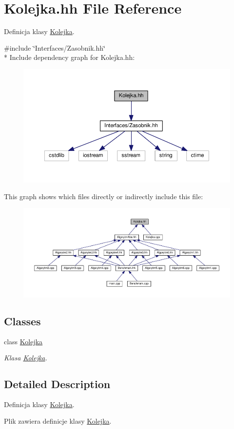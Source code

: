 \hypertarget{a00046}{}\section{Kolejka.\+hh File Reference}
\label{a00046}


Definicja klasy \hyperlink{a00013}{Kolejka}.  


{\ttfamily \#include \char`\"{}Interfaces/\+Zasobnik.\+hh\char`\"{}}\\*
Include dependency graph for Kolejka.\+hh\+:
\nopagebreak
\begin{figure}[H]
\begin{center}
\leavevmode
\includegraphics[width=350pt]{a00098}
\end{center}
\end{figure}
This graph shows which files directly or indirectly include this file\+:
\nopagebreak
\begin{figure}[H]
\begin{center}
\leavevmode
\includegraphics[width=350pt]{a00099}
\end{center}
\end{figure}
\subsection*{Classes}
\begin{DoxyCompactItemize}
\item 
class \hyperlink{a00013}{Kolejka}
\begin{DoxyCompactList}\small\item\em Klasa \hyperlink{a00013}{Kolejka}. \end{DoxyCompactList}\end{DoxyCompactItemize}


\subsection{Detailed Description}
Definicja klasy \hyperlink{a00013}{Kolejka}. 

Plik zawiera definicje klasy \hyperlink{a00013}{Kolejka}. 